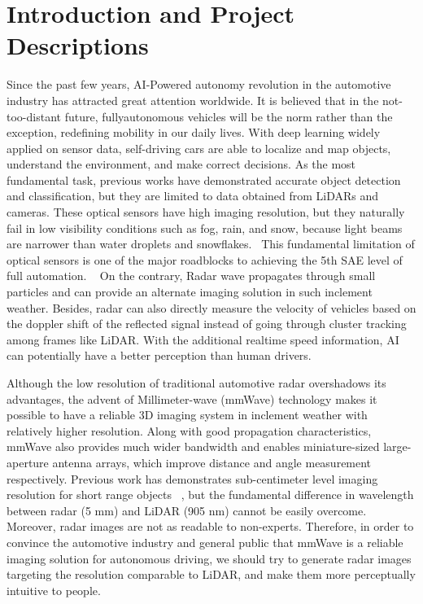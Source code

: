 \section{Introduction and Project Descriptions} \label{introduction}


Since the past few years, AI-Powered autonomy revolution in the automotive industry has attracted great attention worldwide. It is believed that in the not-too-distant future, fullyautonomous vehicles will be the norm rather than the exception, redefining mobility in our daily lives. With deep learning widely applied on sensor data, self-driving cars are able to localize and map objects, understand the environment, and make correct decisions. As the most fundamental task, previous works have demonstrated accurate object detection and classification, but they are limited to data obtained from LiDARs and cameras. These optical sensors have high imaging resolution, but they naturally fail in low visibility conditions such as fog, rain, and snow, because light beams are narrower than water droplets and snowflakes.~\cite{snow} This fundamental limitation of optical sensors is one of the major roadblocks to achieving the 5th SAE level of full automation. ~\cite{SAE} On the contrary, Radar wave propagates through small particles and can provide an alternate imaging solution in such inclement weather. Besides, radar can also directly measure the velocity of vehicles based on the doppler shift of the reflected signal instead of going through cluster tracking among frames like LiDAR. With the additional realtime speed information, AI can potentially have a better perception than human drivers.

Although the low resolution of traditional automotive radar overshadows its advantages, the advent of Millimeter-wave (mmWave) technology makes it possible to have a reliable 3D imaging system in inclement weather with relatively higher resolution. Along with good propagation characteristics, mmWave also provides much wider bandwidth and enables miniature-sized large-aperture antenna arrays, which improve distance and angle measurement respectively. Previous work has demonstrates sub-centimeter level imaging resolution for short range objects ~\cite{mmWave_SAR}, but the fundamental difference in wavelength between radar (5 mm) and LiDAR (905 nm) cannot be easily overcome. Moreover, radar images are not as readable to non-experts. Therefore, in order to convince the automotive industry and general public that mmWave is a reliable imaging solution for autonomous driving, we should try to generate radar images targeting the resolution comparable to LiDAR, and make them more perceptually intuitive to people. 

